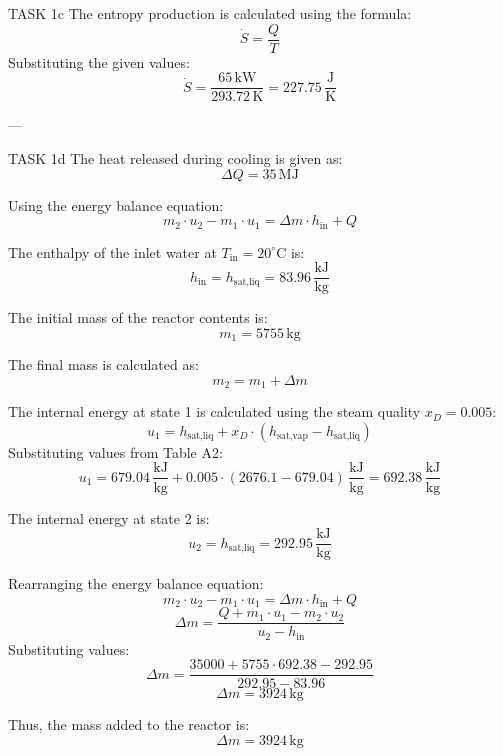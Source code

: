 TASK 1c  
The entropy production is calculated using the formula:  
\[
\dot{S} = \frac{Q}{T}
\]  
Substituting the given values:  
\[
\dot{S} = \frac{65 \, \text{kW}}{293.72 \, \text{K}} = 227.75 \, \frac{\text{J}}{\text{K}}
\]  

---

TASK 1d  
The heat released during cooling is given as:  
\[
\Delta Q = 35 \, \text{MJ}
\]  

Using the energy balance equation:  
\[
m_2 \cdot u_2 - m_1 \cdot u_1 = \Delta m \cdot h_{\text{in}} + Q
\]  

The enthalpy of the inlet water at \( T_{\text{in}} = 20^\circ\text{C} \) is:  
\[
h_{\text{in}} = h_{\text{sat,liq}} = 83.96 \, \frac{\text{kJ}}{\text{kg}}
\]  

The initial mass of the reactor contents is:  
\[
m_1 = 5755 \, \text{kg}
\]  

The final mass is calculated as:  
\[
m_2 = m_1 + \Delta m
\]  

The internal energy at state 1 is calculated using the steam quality \( x_D = 0.005 \):  
\[
u_1 = h_{\text{sat,liq}} + x_D \cdot (h_{\text{sat,vap}} - h_{\text{sat,liq}})
\]  
Substituting values from Table A2:  
\[
u_1 = 679.04 \, \frac{\text{kJ}}{\text{kg}} + 0.005 \cdot (2676.1 - 679.04) \, \frac{\text{kJ}}{\text{kg}} = 692.38 \, \frac{\text{kJ}}{\text{kg}}
\]  

The internal energy at state 2 is:  
\[
u_2 = h_{\text{sat,liq}} = 292.95 \, \frac{\text{kJ}}{\text{kg}}
\]  

Rearranging the energy balance equation:  
\[
m_2 \cdot u_2 - m_1 \cdot u_1 = \Delta m \cdot h_{\text{in}} + Q
\]  
\[
\Delta m = \frac{Q + m_1 \cdot u_1 - m_2 \cdot u_2}{u_2 - h_{\text{in}}}
\]  
Substituting values:  
\[
\Delta m = \frac{35000 + 5755 \cdot 692.38 - 292.95}{292.95 - 83.96}
\]  
\[
\Delta m = 3924 \, \text{kg}
\]  

Thus, the mass added to the reactor is:  
\[
\Delta m = 3924 \, \text{kg}
\]
